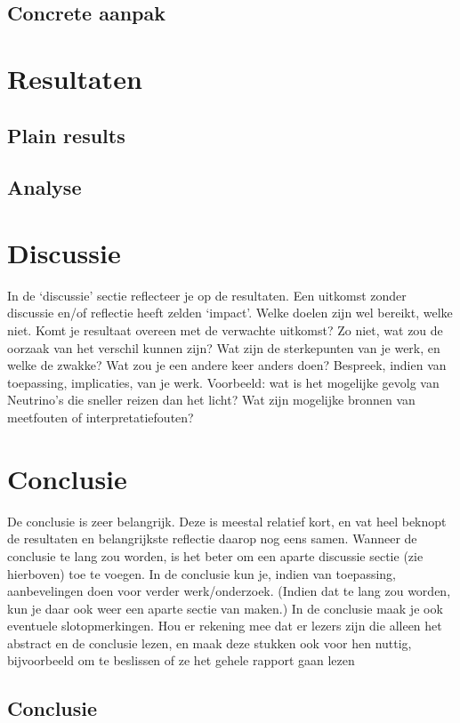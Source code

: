 \documentclass{report}
\begin{document}
\section{Concrete aanpak}

\chapter{Resultaten}

\section{Plain results}



\section{Analyse}
\chapter {Discussie}
In de ‘discussie’ sectie reﬂecteer je op de resultaten. Een uitkomst zonder discussie en/of reﬂectie
heeft zelden ‘impact’. Welke doelen zijn wel bereikt, welke niet. Komt je resultaat overeen met de
verwachte uitkomst? Zo niet, wat zou de oorzaak van het verschil kunnen zijn? Wat zijn de sterkepunten van je werk, en welke de zwakke? Wat zou je een andere keer anders doen? Bespreek, indien
van toepassing, implicaties, van je werk. Voorbeeld: wat is het mogelijke gevolg van Neutrino’s die
sneller reizen dan het licht? Wat zijn mogelijke bronnen van meetfouten of interpretatiefouten?

\chapter{Conclusie}
De conclusie is zeer belangrijk. Deze is meestal relatief kort, en vat heel beknopt de resultaten en
belangrijkste reﬂectie daarop nog eens samen. Wanneer de conclusie te lang zou worden, is het beter
om een aparte discussie sectie (zie hierboven) toe te voegen. In de conclusie kun je, indien van
toepassing, aanbevelingen doen voor verder werk/onderzoek. (Indien dat te lang zou worden, kun je
daar ook weer een aparte sectie van maken.) In de conclusie maak je ook eventuele slotopmerkingen.
Hou er rekening mee dat er lezers zijn die alleen het abstract en de conclusie lezen, en maak deze
stukken ook voor hen nuttig, bijvoorbeeld om te beslissen of ze het gehele rapport gaan lezen

\section{Conclusie}
\end{document}
